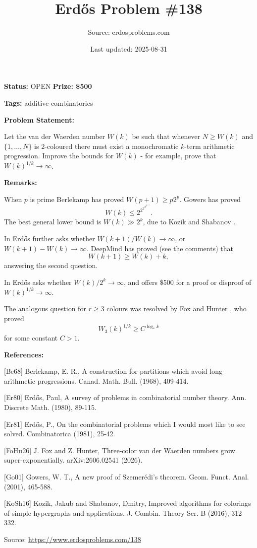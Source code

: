 \documentclass{article}
\title{Erd\H{o}s Problem \#138}
\date{Last updated: 2025-08-31}
\author{Source: erdosproblems.com}
\begin{document}
\maketitle

\noindent\textbf{Status:} OPEN \quad \textbf{Prize: \$500}

\noindent\textbf{Tags:} additive combinatorics

\medskip
\noindent\textbf{Problem Statement:}

Let the van der Waerden number $W(k)$ be such that whenever $N\geq W(k)$ and $\{1,\ldots,N\}$ is $2$-coloured there must exist a monochromatic $k$-term arithmetic progression. Improve the bounds for $W(k)$ - for example, prove that $W(k)^{1/k}\to \infty$.

\bigskip
\noindent\textbf{Remarks:}

When $p$ is prime Berlekamp \cite{Be68} has proved $W(p+1)\geq p2^p$. Gowers \cite{Go01} has proved\[W(k) \leq 2^{2^{2^{2^{2^{k+9}}}}}.\]The best general lower bound is $W(k)\gg 2^k$, due to Kozik and Shabanov \cite{KoSh16}.

In \cite{Er81} Erd\H{o}s further asks whether $W(k+1)/W(k)\to \infty$, or $W(k+1)-W(k)\to \infty$. DeepMind has proved (see the comments) that\[W(k+1)\geq W(k)+k,\]answering the second question.

In \cite{Er80} Erd\H{o}s asks whether $W(k)/2^k\to \infty$, and offers \$500 for a proof or disproof of $W(k)^{1/k}\to \infty$.

The analogous question for $r\geq 3$ colours was resolved by Fox and Hunter \cite{FoHu26}, who proved\[W_3(k)^{1/k}\geq C^{\log_*k}\]for some constant $C>1$.

\bigskip
\noindent\textbf{References:}

[Be68] Berlekamp, E. R., A construction for partitions which avoid long arithmetic progressions. Canad. Math. Bull. (1968), 409-414.
 
 [Er80] Erd\H{o}s, Paul, A survey of problems in combinatorial number theory. Ann. Discrete Math. (1980), 89-115.
 
 [Er81] Erd\H{o}s, P., On the combinatorial problems which I would most like to see solved. Combinatorica (1981), 25-42.
 
 [FoHu26] J. Fox and Z. Hunter, Three-color van der Waerden numbers grow super-exponentially. arXiv:2606.02541 (2026).
 
 [Go01] Gowers, W. T., A new proof of Szemer\'{e}di's theorem. Geom. Funct. Anal. (2001), 465-588.
 
 [KoSh16] Kozik, Jakub and Shabanov, Dmitry, Improved algorithms for colorings of simple hypergraphs and
applications. J. Combin. Theory Ser. B (2016), 312--332.

\bigskip
\noindent\small{Source: \url{https://www.erdosproblems.com/138}}
\end{document}
